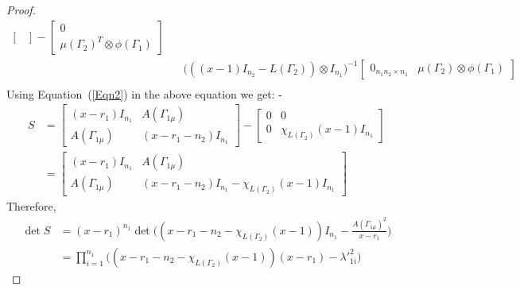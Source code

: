 \documentclass[10pt,a4paper]{amsart}
\begin{document}
\begin{proof}
\begin{equation*}
\begin{split}
\begin{bmatrix}
                \end{bmatrix}-\begin{bmatrix}
                    0\\
                    \mu(\Gamma_2)^T\otimes\phi(\Gamma_1)
                \end{bmatrix} \\ &~~~~\big(((x-1)I_{n_2}-L(\Gamma_2))\otimes I_{n_1}\big)^{-1} \begin{bmatrix}
                    0_{n_1n_2\times n_1}& \mu(\Gamma_2)\otimes\phi(\Gamma_1)
                \end{bmatrix}\\
            \end{split}
        \end{equation*}
        Using Equation~(\ref{Eqn2}) in the above equation we get: -\\
        \begin{equation*}
            \begin{split}
                S&=\begin{bmatrix}
                    (x-r_1)I_{n_1}& A(\Gamma_{1\mu})\\
                    A(\Gamma_{1\mu})& (x-r_1-n_2)I_{n_1}
                \end{bmatrix}-\begin{bmatrix}
                    0& 0\\
                    0& \chi_{L(\Gamma_2)}(x-1)I_{n_1}
                \end{bmatrix}\\
                &=\begin{bmatrix}
                    (x-r_1)I_{n_1}& A(\Gamma_{1\mu})\\
                    A(\Gamma_{1\mu})& (x-r_1-n_2)I_{n_1}-\chi_{L(\Gamma_2)}(x-1)I_{n_1}
                \end{bmatrix}
            \end{split}
        \end{equation*}
        Therefore,
        \begin{equation*}
            \begin{split}
                \det S&=(x-r_1)^{n_1}\det\Big((x-r_1-n_2-\chi_{L(\Gamma_2)}(x-1))I_{n_1}-\frac{A(\Gamma_{1\mu})^2}{x-r_1}\Big)\\
                &=\prod_{i=1}^{n_1}\big((x-r_1-n_2-\chi_{L(\Gamma_2)}(x-1))(x-r_1)-{\lambda'}_{1i}^2\big)
            \end{split}
        \end{equation*}

\end{proof}
\end{document}
